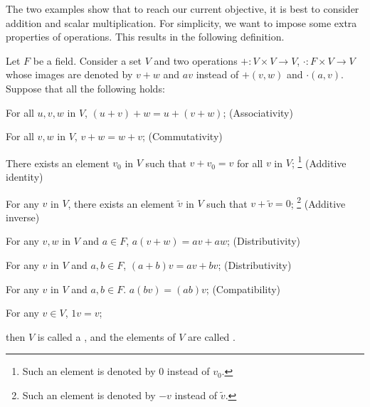 The two examples show that
to reach our current objective,
it is best to consider addition and scalar multiplication.
For simplicity, we want to impose some extra properties of operations.
This results in the following definition.

\begin{definition}
    \label{def:vectorspace}
    Let \(F\) be a field.
    Consider a set \(V\) and two operations
    \(+:V\times V\to V\), \(\cdot:F\times V\to V\)
    whose images are denoted by \(v+w\) and \(av\)
    instead of \(+(v,w)\) and \(\cdot(a,v)\).
    Suppose that all the following holds:
    \begin{axioms}[Vsp]
        \item For all \(u,v,w\) in \(V\), \((u+v)+w=u+(v+w)\);
        \hfill\textsf{(Associativity)}

        \item For all \(v,w\) in \(V\), \(v+w=w+v\);
        \hfill\textsf{(Commutativity)}

        \item There exists an element \(v_0\) in \(V\) such that
        \(v+v_0=v\) for all \(v\) in \(V\);
        \footnote{
            Such an element is denoted by \(0\)
            instead of \(v_0\).}
        \hfill\textsf{(Additive identity)}

        \item For any \(v\) in \(V\),
        there exists an element \(\tilde v\) in \(V\) such that
        \(v+\tilde v=0\);
        \footnote{
            Such an element is denoted by \(-v\)
            instead of \(\tilde v\).}
        \hfill\textsf{(Additive inverse)}

        \item For any \(v,w\) in \(V\) and \(a\in F\),
        \(a(v+w)=av+aw\);
        \hfill\textsf{(Distributivity)}

        \item For any \(v\) in \(V\) and \(a,b\in F\),
        \((a+b)v=av+bv\);
        \hfill\textsf{(Distributivity)}

        \item For any \(v\) in \(V\) and \(a,b\in F\).
        \(a(bv)=(ab)v\);
        \hfill\textsf{(Compatibility)}

        \item For any \(v\in V\), \(1v=v\);
    \end{axioms}
    then \(V\) is called
    a ,
    and the elements of \(V\) are called
    .
\end{definition}